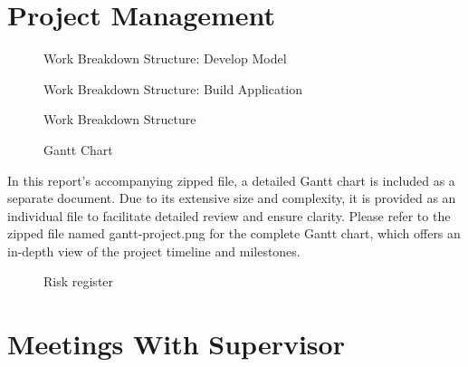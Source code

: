 \documentclass[preprint,11pt,review,authoryear]{elsarticle}
\begin{document}
\section{Project Management}
\renewcommand{\thepage}{J\arabic{page}} %
\begin{figure}[ht]
    
    \caption{Work Breakdown Structure: Develop Model}
    \label{fig:WBS: Develop Model}
\end{figure}
\newpage
\begin{landscape}
    \begin{figure}[ht]
        
        \caption{Work Breakdown Structure: Build Application}
        \label{fig:WBS: Build Application}
    \end{figure}
\end{landscape}
\newpage
\begin{figure}[ht]
    
    \caption{Work Breakdown Structure}
    \label{fig:WBS: Project Charter}
\end{figure}
\newpage
\begin{landscape}
    \begin{figure}[ht]
        \centering
        \caption{Gantt Chart}
        \label{fig:GanttChart}
    \end{figure}
    In this report's accompanying zipped file, a detailed Gantt chart is included as a separate document. Due to its extensive size and complexity, it is provided as an individual file to facilitate detailed review and ensure clarity. Please refer to the zipped file named gantt-project.png for the complete Gantt chart, which offers an in-depth view of the project timeline and milestones.
\end{landscape}
\begin{figure}[ht]
    
    \caption{Risk register}
    \label{fig:Risk Register}
\end{figure}
\newpage
\section{Meetings With Supervisor}
\renewcommand{\thepage}{K\arabic{page}}
\newpage

\end{document}

